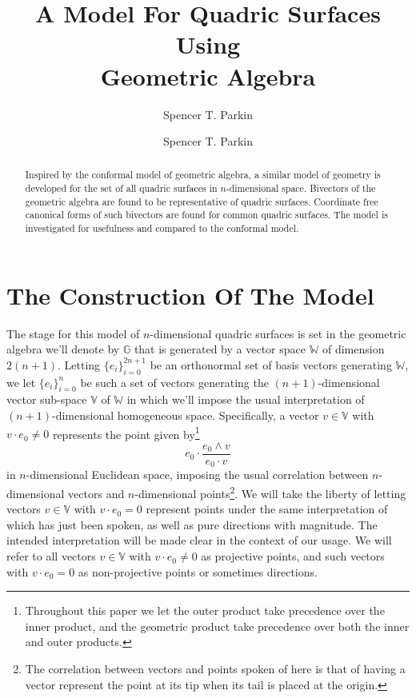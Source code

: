 \documentclass[12pt]{article}
\title{A Model For Quadric Surfaces\\Using\\Geometric Algebra}
\author{Spencer T. Parkin}
\author{Spencer T. Parkin}
\newcommand{\G}{\mathbb{G}}
\newcommand{\V}{\mathbb{V}}
\newcommand{\W}{\mathbb{W}}
\numberwithin{equation}{section}
\begin{document}
\maketitle

\begin{abstract}
Inspired by the conformal model of geometric algebra,
a similar model of geometry is developed for the set
of all quadric surfaces in $n$-dimensional space.  Bivectors of the geometric algebra
are found to be representative of quadric surfaces.  Coordinate free canonical forms
of such bivectors are found for common quadric surfaces.  The model is investigated
for usefulness and compared to the conformal model.
\end{abstract}

\section{The Construction Of The Model}

The stage for this model of $n$-dimensional quadric surfaces is set in the geometric
algebra we'll denote by $\G$ that is generated by a vector space $\W$ of dimension
$2(n+1)$.  Letting $\{e_i\}_{i=0}^{2n+1}$ be an orthonormal set of basis vectors
generating $\W$, we let $\{e_i\}_{i=0}^n$ be such a set of vectors generating
the $(n+1)$-dimensional vector sub-space $\V$ of $\W$ in which we'll impose the
usual interpretation of $(n+1)$-dimensional homogeneous space.  Specifically,
a vector $v\in\V$ with $v\cdot e_0\neq 0$ represents the point given by\footnote{Throughout this
paper we let the outer product take precedence over the inner product, and the geometric product
take precedence over both the inner and outer products.}
\begin{equation}
e_0\cdot\frac{e_0\wedge v}{e_0\cdot v}
\end{equation}
in $n$-dimensional Euclidean space, imposing the usual correlation between $n$-dimensional
vectors and $n$-dimensional points\footnote{The correlation between
vectors and points spoken of here is that of having a vector represent the point
at its tip when its tail is placed at the origin.}.  We will take the liberty of letting vectors $v\in\V$ with $v\cdot e_0=0$
represent points under the same interpretation of which has just been spoken, as
well as pure directions with magnitude.  The intended interpretation will be made clear
in the context of our usage.  We will refer to all vectors $v\in\V$ with $v\cdot e_0\neq 0$
as projective points, and such vectors with $v\cdot e_0=0$ as non-projective points
or sometimes directions.
\end{document}
